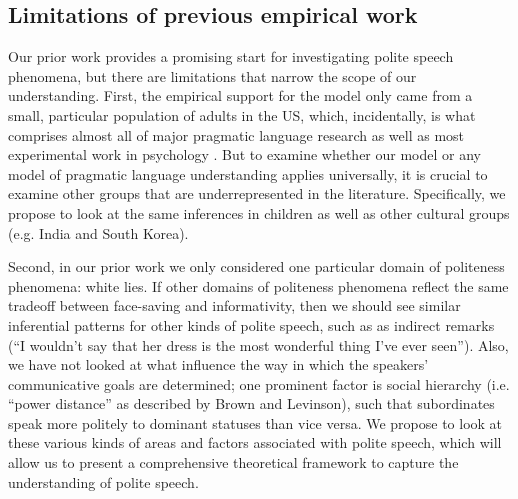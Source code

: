 \subsection{Limitations of previous empirical work}

Our prior work provides a promising start for investigating polite speech phenomena, but there are limitations that narrow the scope of our understanding. First, the empirical support for the model only came from a small, particular population of adults in the US, which, incidentally, is what comprises almost all of major pragmatic language research as well as most experimental work in psychology \citep{henrich2010}. But to examine whether our model or any model of pragmatic language understanding applies universally, it is crucial to examine other groups that are underrepresented in the literature. Specifically, we propose to look at the same inferences in children as well as other cultural groups (e.g. India and South Korea).  

	Second, in our prior work we only considered one particular domain of politeness phenomena: white lies. If other domains of politeness phenomena reflect the same tradeoff between face-saving and informativity, then we should see similar inferential patterns for other kinds of polite speech, such as as indirect remarks (``I wouldn't say that her dress is the most wonderful thing I've ever seen''). Also, we have not looked at what influence the way in which the speakers' communicative goals are determined; one prominent factor is social hierarchy (i.e. ``power distance'' as described by Brown and Levinson), such that subordinates speak more politely to dominant statuses than vice versa. We propose to look at these various kinds of areas and factors associated with polite speech, which will allow us to present a comprehensive theoretical framework to capture the understanding of polite speech.

